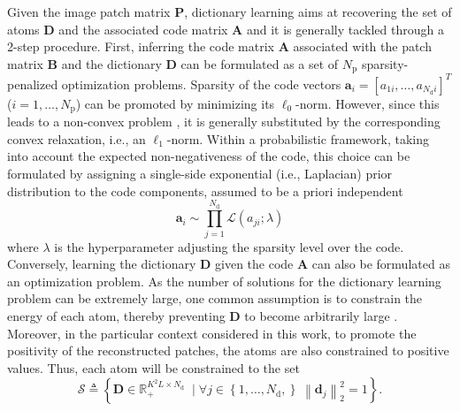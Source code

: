 \documentclass[review]{elsarticle}
\newcommand{\Ndim}{L}
\newcommand{\Psize}{K}
\newcommand{\Natom}{N_{\mathrm{d}}}
\newcommand{\Npatch}{N_{\mathrm{p}}}
\begin{document}
Given the image patch matrix $\mathbf{P}$, dictionary learning aims at recovering the set of atoms $\mathbf{D}$ and the associated code matrix $\mathbf{A}$ and it is generally tackled through a 2-step procedure. First, inferring the code matrix $\mathbf{A}$ associated with the patch matrix $\mathbf{B}$ and the dictionary $\mathbf{D}$ can be formulated as a set of $\Npatch$ sparsity-penalized optimization problems. Sparsity of the code vectors $\mathbf{a}_i=\left[a_{1i},\ldots,a_{\Natom i}\right]^T$ ($i=1,\ldots,\Npatch$) can be promoted by minimizing its $\ell_{0}$-norm. However, since this leads to a non-convex problem \citep{chen_atomic_2001}, it is generally substituted by the corresponding convex relaxation, i.e., an $\ell_1$-norm. Within a probabilistic framework, taking into account the expected non-negativeness of the code, this choice can be formulated by assigning a single-side exponential (i.e., Laplacian) prior distribution to the code components, assumed to be a priori independent
%
 \begin{equation}
	\label{eq:code_model}
	\mathbf{a}_{i} \sim \prod_{j=1}^{\Natom}\mathcal{L}(a_{ji};\lambda)
\end{equation}
%
where $\lambda$ is the hyperparameter adjusting the sparsity level over the code.
%
Conversely, learning the dictionary $\mathbf{D}$ given the code $\mathbf{A}$ can also be formulated as an optimization problem. As the number of solutions for the dictionary learning problem can be extremely large, one common assumption is to constrain the energy of each atom, thereby preventing $\mathbf{D}$ to become arbitrarily large \citep{mairal_online_2009}. Moreover, in the particular context considered in this work, to promote the positivity of the reconstructed patches, the atoms are also constrained to positive values. Thus, each atom will be constrained to the set
%
\begin{equation}\label{eq:dict_dist}
  \mathcal{S} \triangleq \left\{\mathbf{D} \in \mathbb{R}^{\Psize^{2}\Ndim \times \Natom}_{+} \; \mid \forall j \in\left\{ 1,\ldots,\Natom,\right\} \; \left\|\mathbf{d}_j\right\|^2_{2} = 1\right\}.
\end{equation}
%
\end{document}
